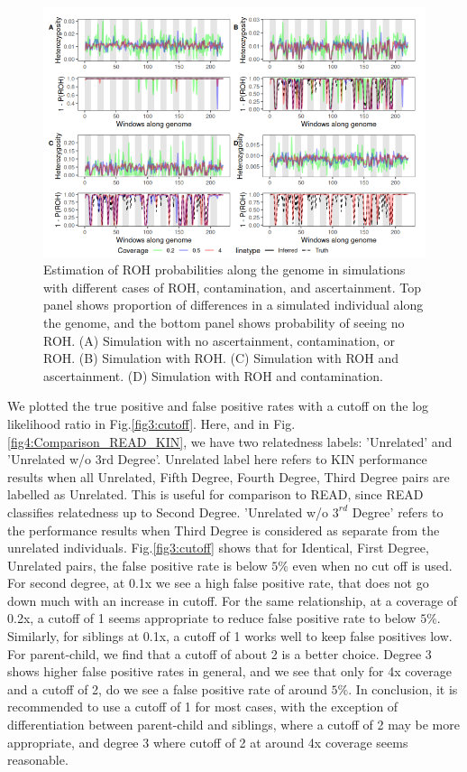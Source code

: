 \documentclass[12pt, letterpaper]{article}
\begin{document}
\begin{figure}[h!]
    \includegraphics[width=16cm]{plots/inkscape_finalImg/ROHplot.png}
    \centering
    \caption{Estimation of ROH probabilities along the genome in simulations with different cases of ROH, contamination, and ascertainment. Top panel shows proportion of differences in a simulated individual along the genome, and the bottom panel shows probability of seeing no ROH. (A) Simulation with no ascertainment, contamination, or ROH. (B) Simulation with ROH. (C) Simulation with ROH and ascertainment. (D) Simulation with ROH and contamination.}
    \label{fig2:ROH}
\end{figure}


We plotted the true positive and false positive rates with a cutoff on the log likelihood ratio in Fig.\ref{fig3:cutoff}. Here, and in Fig.\ref{fig4:Comparison_READ_KIN}, we have two relatedness labels: 'Unrelated' and 'Unrelated w/o 3rd Degree'. Unrelated label here refers to KIN performance results when all Unrelated, Fifth Degree, Fourth Degree, Third Degree pairs are labelled as Unrelated. This is useful for comparison to READ, since READ classifies relatedness up to Second Degree. 'Unrelated w/o $3^{rd}$ Degree' refers to the performance results when Third Degree is considered as separate from the unrelated individuals. Fig.\ref{fig3:cutoff} shows that for Identical, First Degree, Unrelated pairs, the false positive rate is below $5\%$ even when no cut off is used. For second degree, at 0.1x we see a high false positive rate, that does not go down much with an increase in cutoff. For the same relationship, at a coverage of 0.2x, a cutoff of 1 seems appropriate to reduce false positive rate to below $5\%$. Similarly, for siblings at 0.1x, a cutoff of 1 works well to keep false positives low. For parent-child, we find that a cutoff of about 2 is a better choice. Degree 3 shows higher false positive rates in general, and we see that only for 4x coverage and a cutoff of 2, do we see a false positive rate of around $5\%$. In conclusion, it is recommended to use a cutoff of 1 for most cases, with the exception of differentiation between parent-child and siblings, where a cutoff of 2 may be more appropriate, and degree 3 where cutoff of 2 at around 4x coverage seems reasonable. 
\end{document}

